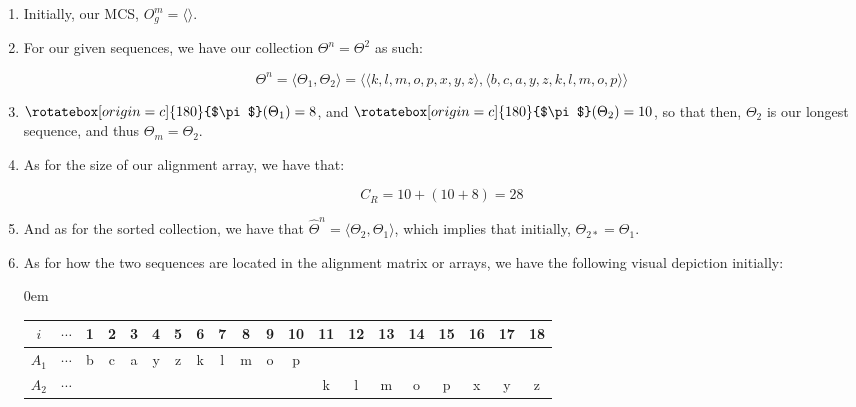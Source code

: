 \documentclass[a4paper, 18pt]{book} %
\newcommand{\invpi}{\rotatebox[origin=c]{180}{$\pi$}}
\begin{document}
\begin{enumerate}
\item Initially, our MCS, $O^m_g = \langle \rangle$.
\item{ For our given sequences, we have our collection $\Theta^n = \Theta^2$ as such:

\vspace{1em}
\begin{equation}
 \Theta^n = \langle \Theta_1, \Theta_2 \rangle = \langle \langle k, l, m, o, p, x, y, z \rangle , \langle b, c, a, y, z, k, l, m, o, p \rangle \rangle
\end{equation}
\vspace{1em}

}
\item $\invpi(\Theta_1) = 8$, and $\invpi(\Theta_2) = 10$, so that then, $\Theta_2$ is our longest sequence, and thus $\Theta_m = \Theta_2$.
\item{ As for the size of our alignment array, we have that:

\begin{equation}
C_R = 10 + (10 + 8) = 28
\end{equation}


}
\item And as for the sorted collection, we have that $\hat{\Theta}^n = \langle \Theta_2, \Theta_1 \rangle$, which implies that initially, $\Theta_{2*} = \Theta_1$.
\item{As for how the two sequences are located in the alignment matrix or arrays, we have the following visual depiction initially:

\vspace{1em}
\begin{adjustwidth}{0em}{}
\begin{tabular}[H]{|c||c|c|c|c|c|c|c|c|c|c|c|c|c|c|c|c|c|c|c|}
\hline
$i$ & $\cdots$ & 1 & 2 & 3 & 4 & 5 & 6 & 7 & 8 & 9 & 10 & 11 & 12 & 13 & 14 & 15 & 16 & 17 & 18 \\
\hline
$A_1$ & $\cdots$ & b & c & a & y & z & k & l & m & o & p &  &  &  &  &  &  &  &  \\
\hline
$A_2$ & $\cdots$ &  &  &  &  &  &  &  &  &  &  & k & l & m & o & p & x & y & z  \\
\hline
 
\end{tabular}
\end{adjustwidth}
\vspace{1em}

}
\end{enumerate}
\end{document}
